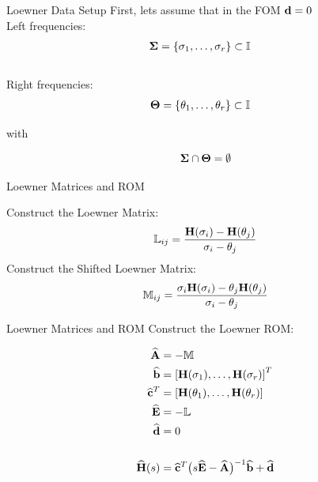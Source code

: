 \begin{frame}{Loewner Data Setup}
First, lets assume that in the FOM ${\bf d} =0$\\
\bigskip
Left frequencies:
\begin{align*}
    {\bf \Sigma} &= \{\sigma_1, \dots, \sigma_r\} \subset \mathbb{I}
\end{align*}
\\
Right frequencies:
\begin{align*}
    {\bf \Theta} &= \{\theta_1, \dots, \theta_r\} \subset \mathbb{I}
\end{align*}

with

$${\bf \Sigma} \cap {\bf \Theta} = \emptyset$$

\end{frame}
\begin{frame}{Loewner Matrices and ROM}

Construct the Loewner Matrix:
\begin{align*}
    \mathbb{L}_{ij} &=  \frac{{\bf H}(\sigma_i)-{\bf H}(\theta_j)}{\sigma_i - \theta_j}\\
\end{align*}
Construct the Shifted Loewner Matrix:
\begin{align*}
    \mathbb{M}_{ij} &= \frac{\sigma_i{\bf H}(\sigma_i)-\theta_j{\bf H}(\theta_j)}{\sigma_i - \theta_j}\\
\end{align*}

\end{frame}
\begin{frame}{Loewner Matrices and ROM}
Construct the Loewner ROM:

\begin{align*}
    {\bf \widehat{A} } & = -\mathbb{M} \\
    {\bf \widehat{b} } & = \left[{\bf H}(\sigma_1), \dots, {\bf H}(\sigma_r) \right]^T\\
    {\bf \widehat{c}}^T & = \left[{\bf H}(\theta_1), \dots, {\bf H}(\theta_r) \right]\\
    {\bf \widehat{E} } & = -\mathbb{L}\\
    {\bf \widehat{d} } & = 0 \\ \\
    {\bf \widehat{H}}(s) & = {\bf \widehat{c}}^T \big( s{\bf \widehat{E}}-{\bf \widehat{A}} \big)^{-1} {\bf \widehat{b}} + {\bf \widehat{d}}
\end{align*}


\end{frame}


